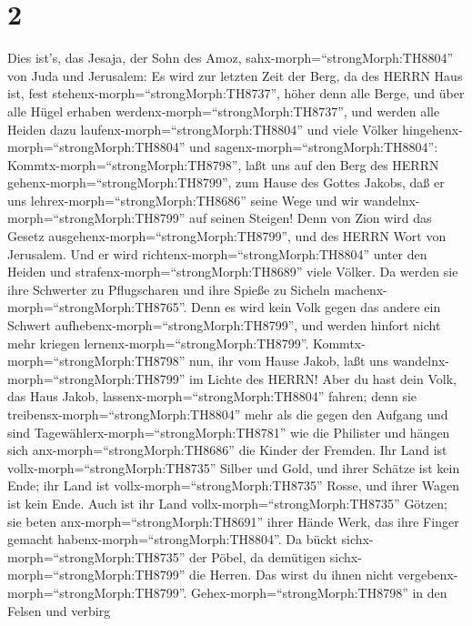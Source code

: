 \hypertarget{section-1}{%
\section{2}\label{section-1}}

 Dies ist's, das Jesaja, der Sohn des Amoz,
sahx-morph=``strongMorph:TH8804'' von Juda und Jerusalem: 
Es wird zur letzten Zeit der Berg, da des HERRN Haus ist, fest
stehenx-morph=``strongMorph:TH8737'', höher denn alle Berge, und über
alle Hügel erhaben werdenx-morph=``strongMorph:TH8737'', und werden alle
Heiden dazu laufenx-morph=``strongMorph:TH8804''  und viele
Völker hingehenx-morph=``strongMorph:TH8804'' und
sagenx-morph=``strongMorph:TH8804'':
Kommtx-morph=``strongMorph:TH8798'', laßt uns auf den Berg des HERRN
gehenx-morph=``strongMorph:TH8799'', zum Hause des Gottes Jakobs, daß er
uns lehrex-morph=``strongMorph:TH8686'' seine Wege und wir
wandelnx-morph=``strongMorph:TH8799'' auf seinen Steigen! Denn von Zion
wird das Gesetz ausgehenx-morph=``strongMorph:TH8799'', und des HERRN
Wort von Jerusalem.  Und er wird
richtenx-morph=``strongMorph:TH8804'' unter den Heiden und
strafenx-morph=``strongMorph:TH8689'' viele Völker. Da werden sie ihre
Schwerter zu Pflugscharen und ihre Spieße zu Sicheln
machenx-morph=``strongMorph:TH8765''. Denn es wird kein Volk gegen das
andere ein Schwert aufhebenx-morph=``strongMorph:TH8799'', und werden
hinfort nicht mehr kriegen lernenx-morph=``strongMorph:TH8799''.
 Kommtx-morph=``strongMorph:TH8798'' nun, ihr vom Hause
Jakob, laßt uns wandelnx-morph=``strongMorph:TH8799'' im Lichte des
HERRN!  Aber du hast dein Volk, das Haus Jakob,
lassenx-morph=``strongMorph:TH8804'' fahren; denn sie
treibensx-morph=``strongMorph:TH8804'' mehr als die gegen den Aufgang
und sind Tagewählerx-morph=``strongMorph:TH8781'' wie die Philister und
hängen sich anx-morph=``strongMorph:TH8686'' die Kinder der Fremden.
 Ihr Land ist vollx-morph=``strongMorph:TH8735'' Silber und
Gold, und ihrer Schätze ist kein Ende; ihr Land ist
vollx-morph=``strongMorph:TH8735'' Rosse, und ihrer Wagen ist kein Ende.
 Auch ist ihr Land vollx-morph=``strongMorph:TH8735''
Götzen; sie beten anx-morph=``strongMorph:TH8691'' ihrer Hände Werk, das
ihre Finger gemacht habenx-morph=``strongMorph:TH8804''.  Da
bückt sichx-morph=``strongMorph:TH8735'' der Pöbel, da demütigen
sichx-morph=``strongMorph:TH8799'' die Herren. Das wirst du ihnen nicht
vergebenx-morph=``strongMorph:TH8799''. 
Gehex-morph=``strongMorph:TH8798'' in den Felsen und verbirg
